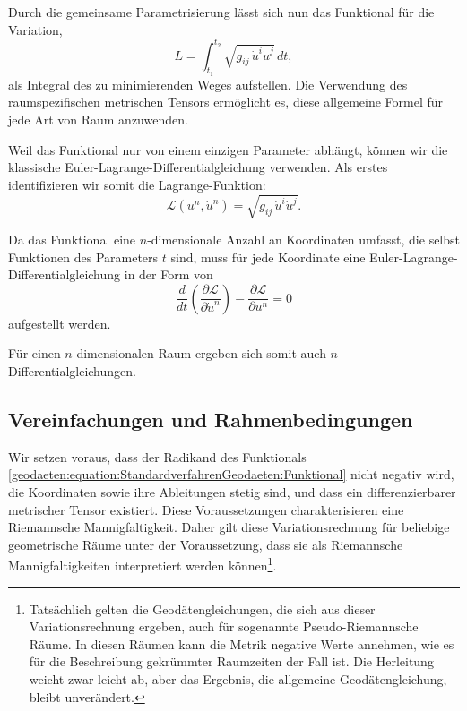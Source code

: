 Durch die gemeinsame Parametrisierung lässt sich nun das Funktional für die Variation,
\begin{equation}
	L = \int_{t_1}^{t_2} \sqrt{g_{ij} \, \dot{u}^i \dot{u}^j} \, dt,
	\label{geodaeten:equation:StandardverfahrenGeodaeten:Funktional}
\end{equation}
als Integral des zu minimierenden Weges aufstellen.
Die Verwendung des raumspezifischen metrischen Tensors ermöglicht es, diese allgemeine Formel für jede Art von Raum anzuwenden.

Weil das Funktional nur von einem einzigen Parameter abhängt, können wir die klassische Euler-Lagrange-Differentialgleichung verwenden.
Als erstes identifizieren wir somit die Lagrange-Funktion:
\begin{equation}
	\mathcal{L}(u^n, \dot{u}^n) = \sqrt{g_{ij} \, \dot{u}^i \dot{u}^j}.
	\label{geodaeten:equation:StandardverfahrenGeodaeten:LagrangeFunktion}
\end{equation}

Da das Funktional eine $n$-dimensionale Anzahl an Koordinaten umfasst, die selbst Funktionen des Parameters $t$ sind, muss für jede Koordinate eine Euler-Lagrange-Differentialgleichung in der Form von
\begin{equation}
	\frac{d}{dt} \left(\frac{\partial \mathcal{L}}{\partial \dot{u}^n}\right) - \frac{\partial \mathcal{L}}{\partial u^n} = 0
	\label{geodaeten:equation:StandardverfahrenGeodaeten:DGL1}
\end{equation}
aufgestellt werden.

Für einen $n$-dimensionalen Raum ergeben sich somit auch $n$ Differentialgleichungen. 

\subsection{Vereinfachungen und Rahmenbedingungen}
Wir setzen voraus, dass der Radikand des Funktionals \eqref{geodaeten:equation:StandardverfahrenGeodaeten:Funktional} nicht negativ wird, die Koordinaten sowie ihre Ableitungen stetig sind, und dass ein differenzierbarer metrischer Tensor existiert. 
Diese Voraussetzungen charakterisieren eine Riemannsche Mannigfaltigkeit.
Daher gilt diese Variationsrechnung für beliebige geometrische Räume unter der Voraussetzung, dass sie als Riemannsche Mannigfaltigkeiten interpretiert werden können\footnote{Tatsächlich gelten die Geodätengleichungen, die sich aus dieser Variationsrechnung ergeben, auch für sogenannte Pseudo-Riemannsche Räume.
	In diesen Räumen kann die Metrik negative Werte annehmen, wie es für die Beschreibung gekrümmter Raumzeiten der Fall ist.
	Die Herleitung weicht zwar leicht ab, aber das Ergebnis, die allgemeine Geodätengleichung, bleibt unverändert.
}.

